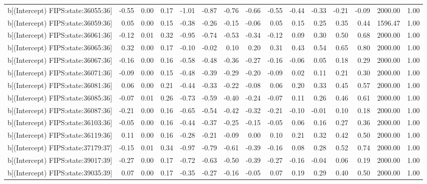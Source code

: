 \begin{table}[ht]
\begin{tabular}{rrrrrrrrrrrrrrr}
  b[(Intercept) FIPS:state:36055:36] & -0.55 & 0.00 & 0.17 & -1.01 & -0.87 & -0.76 & -0.66 & -0.55 & -0.44 & -0.33 & -0.21 & -0.09 & 2000.00 & 1.00 \\ 
  b[(Intercept) FIPS:state:36059:36] & 0.05 & 0.00 & 0.15 & -0.38 & -0.26 & -0.15 & -0.06 & 0.05 & 0.15 & 0.25 & 0.35 & 0.44 & 1596.47 & 1.00 \\ 
  b[(Intercept) FIPS:state:36061:36] & -0.12 & 0.01 & 0.32 & -0.95 & -0.74 & -0.53 & -0.34 & -0.12 & 0.09 & 0.30 & 0.50 & 0.68 & 2000.00 & 1.00 \\ 
  b[(Intercept) FIPS:state:36065:36] & 0.32 & 0.00 & 0.17 & -0.10 & -0.02 & 0.10 & 0.20 & 0.31 & 0.43 & 0.54 & 0.65 & 0.80 & 2000.00 & 1.00 \\ 
  b[(Intercept) FIPS:state:36067:36] & -0.16 & 0.00 & 0.16 & -0.58 & -0.48 & -0.36 & -0.27 & -0.16 & -0.06 & 0.05 & 0.18 & 0.29 & 2000.00 & 1.00 \\ 
  b[(Intercept) FIPS:state:36071:36] & -0.09 & 0.00 & 0.15 & -0.48 & -0.39 & -0.29 & -0.20 & -0.09 & 0.02 & 0.11 & 0.21 & 0.30 & 2000.00 & 1.00 \\ 
  b[(Intercept) FIPS:state:36081:36] & 0.06 & 0.00 & 0.21 & -0.44 & -0.33 & -0.22 & -0.08 & 0.06 & 0.20 & 0.33 & 0.45 & 0.57 & 2000.00 & 1.00 \\ 
  b[(Intercept) FIPS:state:36085:36] & -0.07 & 0.01 & 0.26 & -0.73 & -0.59 & -0.40 & -0.24 & -0.07 & 0.11 & 0.26 & 0.46 & 0.61 & 2000.00 & 1.00 \\ 
  b[(Intercept) FIPS:state:36087:36] & -0.21 & 0.00 & 0.16 & -0.65 & -0.54 & -0.42 & -0.32 & -0.21 & -0.10 & -0.01 & 0.10 & 0.18 & 2000.00 & 1.00 \\ 
  b[(Intercept) FIPS:state:36103:36] & -0.05 & 0.00 & 0.16 & -0.44 & -0.37 & -0.25 & -0.15 & -0.05 & 0.06 & 0.16 & 0.27 & 0.36 & 2000.00 & 1.00 \\ 
  b[(Intercept) FIPS:state:36119:36] & 0.11 & 0.00 & 0.16 & -0.28 & -0.21 & -0.09 & 0.00 & 0.10 & 0.21 & 0.32 & 0.42 & 0.50 & 2000.00 & 1.00 \\ 
  b[(Intercept) FIPS:state:37179:37] & -0.15 & 0.01 & 0.34 & -0.97 & -0.79 & -0.61 & -0.39 & -0.16 & 0.08 & 0.28 & 0.52 & 0.74 & 2000.00 & 1.00 \\ 
  b[(Intercept) FIPS:state:39017:39] & -0.27 & 0.00 & 0.17 & -0.72 & -0.63 & -0.50 & -0.39 & -0.27 & -0.16 & -0.04 & 0.06 & 0.19 & 2000.00 & 1.00 \\ 
  b[(Intercept) FIPS:state:39035:39] & 0.07 & 0.00 & 0.17 & -0.35 & -0.27 & -0.16 & -0.05 & 0.07 & 0.19 & 0.29 & 0.40 & 0.50 & 2000.00 & 1.00 \\ 

\end{tabular}
\end{table}
